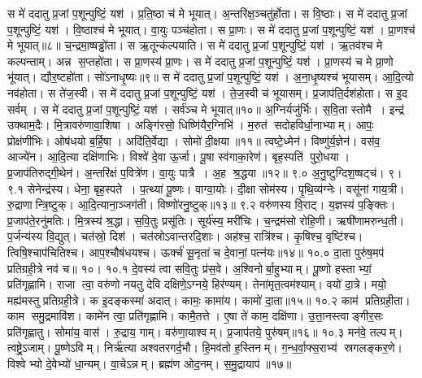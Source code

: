 स मे॑ ददातु प्र॒जां प॒शून्पुष्टिं॒ यश॑। प्र॒ति॒ष्ठा च॑ मे भूयात्। अ॒न्तरि॑क्ष॒ञ्चतु॑र्\mbox{}होता। स वि॒ष्ठाः। स मे॑ ददातु प्र॒जां प॒शून्पुष्टिं॒ यश॑। वि॒ष्ठाश्च॑ मे भूयात्। वा॒युः पञ्च॑होता। स प्रा॒णः। स मे॑ ददातु प्र॒जां प॒शून्पुष्टिं॒ यश॑। प्रा॒णश्च॑ मे भूयात्॥८॥
च॒न्द्रमा॒ष्षड्ढो॑ता। स ऋ॒तून्क॑ल्पयाति। स मे॑ ददातु प्र॒जां प॒शून्पुष्टिं॒ यश॑। ऋ॒तव॑श्च मे कल्पन्ताम्। अन्न स॒प्तहो॑ता। स प्रा॒णस्य॑ प्रा॒णः। स मे॑ ददातु प्र॒जां प॒शून्पुष्टिं॒ यश॑। प्रा॒णस्य॑ च मे प्रा॒णो भू॑यात्। द्यौर॒ष्टहो॑ता। सो॑ऽनाधृ॒ष्यः॥९॥%
स मे॑ ददातु प्र॒जां प॒शून्पुष्टिं॒ यश॑। अ॒ना॒धृ॒ष्यश्च॑ भूयासम्। आ॒दि॒त्यो नव॑होता। स ते॑ज॒स्वी। स मे॑ ददातु प्र॒जां प॒शून्पुष्टिं॒ यश॑। ते॒ज॒स्वी च॑ भूयासम्। प्र॒जाप॑ति॒र्दश॑होता। स इ॒द सर्वम्। स मे॑ ददातु प्र॒जां प॒शून्पुष्टिं॒ यश॑। सर्व॑ञ्च मे भूयात्॥१०॥%
\anuvakamend[प्र॒ति॒ष्ठा प्रा॒णश्च॑ मे भूयादनाधृ॒ष्यः सर्वं॑ च मे भूयात्]
अ॒ग्निर्यजु॑र्भिः। स॒वि॒ता स्तोमै। इन्द्र॑ उक्थाम॒दैः। मि॒त्रावरु॑णावा॒शिषा। अङ्गि॑रसो॒ धिष्णि॑यैर॒ग्निभि॑। म॒रुत॑ सदोहविर्धा॒नाभ्याम्। आपः॒ प्रोक्ष॑णीभिः। ओष॑धयो ब॒र्\mbox{}हि॒षा। अदि॑ति॒र्वेद्या। सोमो॑ दी॒क्षया॥११॥
त्वष्टे॒ध्मेन॑। विष्णु॑र्य॒ज्ञेन॑। वस॑व॒ आज्ये॑न। आ॒दि॒त्या दक्षि॑णाभिः। विश्वे॑ दे॒वा ऊ॒र्जा। पू॒षा स्व॑गाका॒रेण॑। बृह॒स्पति॑ पुरो॒धया। प्र॒जाप॑तिरुद्गी॒थेन॑। अ॒न्तरि॑क्षं प॒वित्रे॑ण। वा॒युः पात्रै। अ॒ह श्र॒द्धया॥१२॥
९.०
अ॒नु॒ष्टुग्दिश॒ष्षट्च॑। ९।
\anuvakamend[दी॒क्षया॒ पात्रै॒रेक॑ञ्च]
९.१
सेनेन्द्र॑स्य। धेना॒ बृह॒स्पते। प॒त्थ्या॑ पू॒ष्णः। वाग्वा॒योः। दी॒क्षा सोम॑स्य। पृ॒थि॒व्य॑ग्नेः। वसू॑नां  गाय॒त्री। रु॒द्राणान्त्रि॒ष्टुक्। आ॒दि॒त्याना॒ञ्जग॑ती। विष्णो॑रनु॒ष्टुक्॥१३॥%
९.२
वरु॑णस्य वि॒राट्। य॒ज्ञस्य॑ प॒ङ्क्तिः। प्र॒जाप॑ते॒रनु॑मतिः। मि॒त्रस्य॑ श्र॒द्धा। स॒वि॒तुः प्रसू॑तिः। सूर्य॑स्य॒ मरी॑चिः। च॒न्द्रम॑सो रोहि॒णी। ऋषी॑णामरुन्ध॒ती। प॒र्जन्य॑स्य वि॒द्युत्। चत॑स्रो॒ दिश॑। चत॑स्रोऽवान्तरदि॒शाः। अह॑श्च॒ रात्रि॑श्च। कृ॒षिश्च॒ वृष्टि॑श्च। त्विषि॒श्चाप॑चितिश्च। आप॒श्चौष॑धयश्च। ऊर्क्च॑ सू॒नृता॑ च दे॒वानां॒ पत्न॑यः॥१४॥%
१०.०
दा॒ता पुरु॑ष॒मप॑ प्रतिग्रही॒त्रे नव॑ च॥ १०।
\anuvakamend
१०.१
दे॒वस्य॑ त्वा सवि॒तुः प्र॑स॒वे। अ॒श्विनोर्बा॒हुभ्याम्। पू॒ष्णो हस्ताभ्यां॒ प्रति॑गृह्णामि। राजा त्वा॒ वरु॑णो नयतु देवि दक्षिणे॒ऽग्नये॒ हिर॑ण्यम्। तेना॑मृत॒त्वम॑श्याम्। वयो॑ दा॒त्रे। मयो॒ मह्य॑मस्तु प्रतिग्रही॒त्रे। क इ॒दङ्कस्मा॑ अदात्। कामः॒ कामा॑य। कामो॑ दा॒ता॥१५॥
१०.२
काम॑ प्रतिग्रही॒ता। काम समु॒द्रमावि॑श। कामे॑न त्वा॒ प्रति॑गृह्णामि। कामै॒तत्ते। ए॒षा ते॑ काम॒ दक्षि॑णा। उ॒त्ता॒नस्त्वाङ्गीर॒सः प्रति॑गृह्णातु। सोमा॑य॒ वास॑। रु॒द्राय॒ गाम्। वरु॑णा॒याश्वम्। प्र॒जाप॑तये॒ पुरु॑षम्॥१६॥%
१०.३
मन॑वे॒ तल्पम्। त्वष्ट्रे॒ऽजाम्। पू॒ष्णेऽविम्। निर्\mbox{}ऋ॑त्या अश्वतरगर्द॒भौ। हि॒मव॑तो ह॒स्तिनम्। ग॒न्ध॒र्वा॒फ्स॒राभ्य॑ स्रगलङ्कर॒णे। विश्वेभ्यो दे॒वेभ्यो॑ धा॒न्यम्। वा॒चेऽन्नम्। ब्रह्म॑ण ओद॒नम्। स॒मु॒द्रायाप॑॥१७॥
